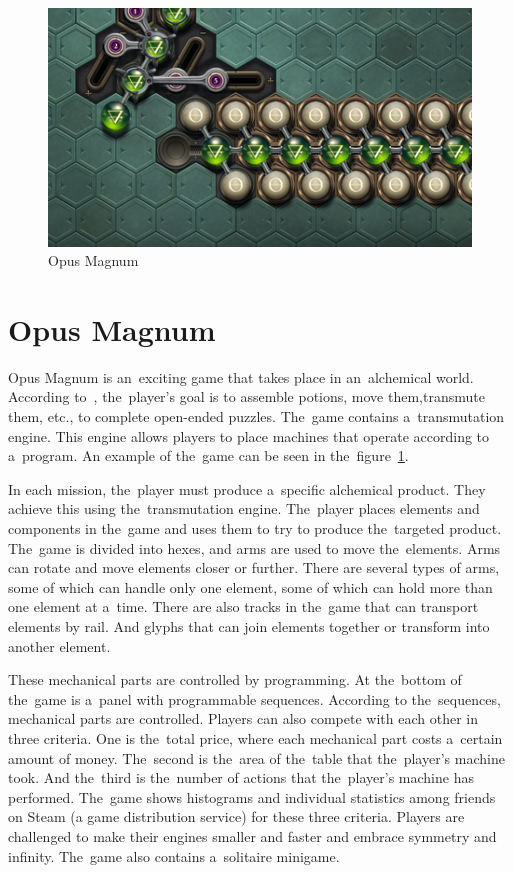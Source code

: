 \begin{figure}
    \centering
    \includegraphics[width=1\linewidth]{assets/similar-games/opusmagnum.png}
    \caption{Opus Magnum~\cite{a2022_zachtronics}}
    \label{fig:opusmagnum}
\end{figure}

\pagebreak
\section{Opus Magnum}
\label{similar-games:opus-magnum}

Opus Magnum is an~exciting game that takes place in an~alchemical world.
\linebreak
According to~\cite{a2022_zachtronics}, the~player's goal is to assemble potions, move them,\linebreak{}transmute them, etc., to complete open-ended puzzles.
The~game contains a~transmutation engine.
This engine allows players to place machines that operate according to a~program.
An example of the~game can be seen in the~figure~\ref{fig:opusmagnum}.

In each mission, the~player must produce a~specific alchemical product.
They achieve this using the~transmutation engine.
The~player places elements and components in the~game and uses them to try to produce the~targeted product.
The~game is divided into hexes, and arms are used to move the~elements.
Arms can rotate and move elements closer or further.
There are several types of arms, some of which can handle only one element, some of which can hold more than one element at a~time.
There are also tracks in the~game that can transport elements by rail.
And glyphs that can join elements together or transform into another element.

These mechanical parts are controlled by programming.
At the~bottom of the~game is a~panel with programmable sequences.
According to the~sequences, mechanical parts are controlled.
Players can also compete with each other in three criteria.
One is the~total price, where each mechanical part costs a~certain amount of money.
The~second is the~area of the~table that the~player's machine took.
And the~third is the~number of actions that the~player's machine has performed.
The~game shows histograms and individual statistics among friends on Steam (a game distribution service) for these three criteria.
Players are challenged to make their engines smaller and faster and embrace symmetry and infinity.
The~game also contains a~solitaire minigame.

